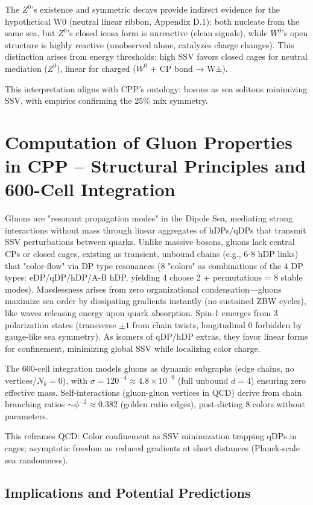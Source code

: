 \documentclass{article}
\begin{document}
The $Z^0$'s existence and symmetric decays provide indirect evidence for the hypothetical W0 (neutral linear ribbon, Appendix D.1): both nucleate from the same sea, but $Z^0$'s closed icosa form is unreactive (clean signals), while $W^0$'s open structure is highly reactive (unobserved alone, catalyzes charge changes). This distinction arises from energy thresholds: high SSV favors closed cages for neutral mediation ($Z^0$), linear for charged ($W^0$ + CP bond → W±).

This interpretation aligns with CPP's ontology: bosons as sea solitons minimizing SSV, with empirics confirming the 25\% mix symmetry.

\section{Computation of Gluon Properties in CPP -- Structural Principles and 600-Cell Integration}

Gluons are "resonant propagation modes" in the Dipole Sea, mediating strong interactions without mass through linear aggregates of hDPs/qDPs that transmit SSV perturbations between quarks. Unlike massive bosons, gluons lack central CPs or closed cages, existing as transient, unbound chains (e.g., 6-8 hDP links) that "color-flow" via DP type resonances (8 "colors" as combinations of the 4 DP types: eDP/qDP/hDP/A-B hDP, yielding 4 choose 2 + permutations = 8 stable modes). Masslessness arises from zero organizational condensation—gluons maximize sea order by dissipating gradients instantly (no sustained ZBW cycles), like waves releasing energy upon quark absorption. Spin-1 emerges from 3 polarization states (transverse $\pm1$ from chain twists, longitudinal 0 forbidden by gauge-like sea symmetry). As isomers of qDP/hDP extras, they favor linear forms for confinement, minimizing global SSV while localizing color charge.

The 600-cell integration models gluons as dynamic subgraphs (edge chains, no vertices/$N_k=0$), with $\sigma=120^{-4} \approx 4.8 \times 10^{-9}$ (full unbound $d=4$) ensuring zero effective mass. Self-interactions (gluon-gluon vertices in QCD) derive from chain branching ratios $\sim\phi^{-2} \approx 0.382$ (golden ratio edges), post-dicting 8 colors without parameters.

This reframes QCD: Color confinement as SSV minimization trapping qDPs in cages; asymptotic freedom as reduced gradients at short distances (Planck-scale sea randomness).

\subsection{Implications and Potential Predictions}
\end{document}
